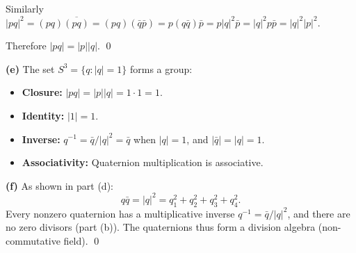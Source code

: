 \documentclass[12pt]{article}
\begin{document}
Similarly $|pq|^2 = (pq)\overline{(pq)} = (pq)(\bar{q}\bar{p}) = p(q\bar{q})\bar{p} = p|q|^2\bar{p} = |q|^2 p\bar{p} = |q|^2|p|^2$.

Therefore $|pq| = |p||q|$. \qed

\textbf{(e)} The set $S^3 = \{q : |q| = 1\}$ forms a group:
\begin{itemize}
\item \textbf{Closure:} $|pq| = |p||q| = 1\cdot 1 = 1$. \checkmark
\item \textbf{Identity:} $|1| = 1$. \checkmark
\item \textbf{Inverse:} $q^{-1} = \bar{q}/|q|^2 = \bar{q}$ when $|q| = 1$, and $|\bar{q}| = |q| = 1$. \checkmark
\item \textbf{Associativity:} Quaternion multiplication is associative. \checkmark
\end{itemize}

\textbf{(f)} As shown in part (d):
\[
q\bar{q} = |q|^2 = q_1^2 + q_2^2 + q_3^2 + q_4^2.
\]
Every nonzero quaternion has a multiplicative inverse $q^{-1} = \bar{q}/|q|^2$, and there are no zero divisors (part (b)). The quaternions thus form a division algebra (non-commutative field). \qed
\end{document}

